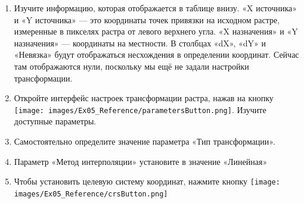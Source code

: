 \documentclass[
  12pt,
]{book}
\begin{document}
\begin{enumerate}
\def\labelenumi{\arabic{enumi}.}
\setcounter{enumi}{9}
\item
  Изучите информацию, которая отображается в таблице внизу. «X источника» и «Y источника» --- это координаты точек привязки на исходном растре, измеренные в пикселях растра от левого верхнего угла. «X назначения» и «Y назначения» --- координаты на местности. В столбцах «dX», «dY» и «Невязка» будут отображаться несхождения в определении координат. Сейчас там отображаются нули, поскольку мы ещё не задали настройки трансформации.
\item
  Откройте интерфейс настроек трансформации растра, нажав на кнопку \texttt{[image: images/Ex05\_Reference/parametersButton.png]}. Изучите доступные параметры.
\item
  Самостоятельно определите значение параметра «Тип трансформации».
\item
  Параметр «Метод интерполяции» установите в значение «Линейная»
\item
  Чтобы установить целевую систему координат, нажмите кнопку \texttt{[image: images/Ex05\_Reference/crsButton.png]}


\end{enumerate}
\end{document}
